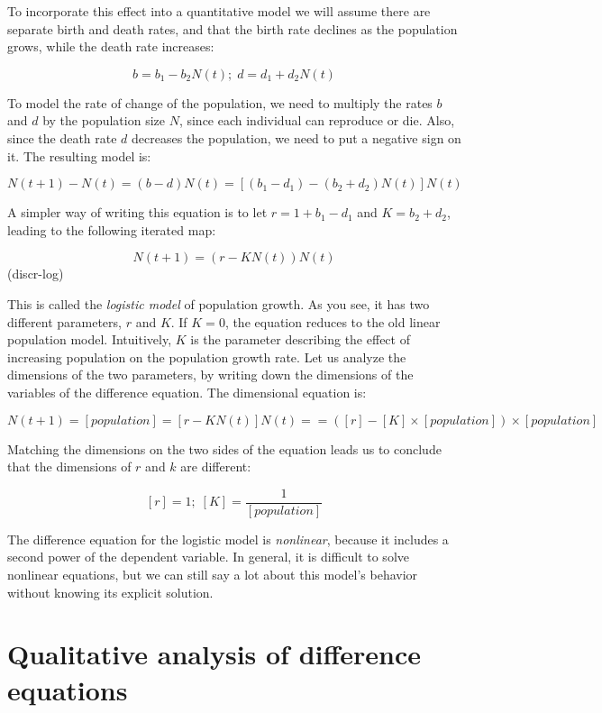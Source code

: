 \documentclass[
  letterpaper,
  DIV=11,
  numbers=noendperiod]{scrreprt}
\begin{document}
To incorporate this effect into a quantitative model we will assume
there are separate birth and death rates, and that the birth rate
declines as the population grows, while the death rate increases:

\[
b =  b_1 - b_2 N(t) ; \;   d = d_1 + d_2 N(t)
\]

To model the rate of change of the population, we need to multiply the
rates \(b\) and \(d\) by the population size \(N\), since each
individual can reproduce or die. Also, since the death rate \(d\)
decreases the population, we need to put a negative sign on it. The
resulting model is:

\[
N(t+1) - N(t) = (b -d)N(t) = [(b_1 - d_1) - (b_2 + d_2)N(t)] N(t)
\]

A simpler way of writing this equation is to let \(r = 1 + b_1 - d_1\)
and \(K = b_2 + d_2\), leading to the following iterated map:

\[
N(t+1) = (r - K N(t)) N(t)
\] (discr-log)

This is called the \emph{logistic model} of population growth. As you
see, it has two different parameters, \(r\) and \(K\). If \(K = 0\), the
equation reduces to the old linear population model. Intuitively, \(K\)
is the parameter describing the effect of increasing population on the
population growth rate. Let us analyze the dimensions of the two
parameters, by writing down the dimensions of the variables of the
difference equation. The dimensional equation is:

\[
N(t+1) = [population]= [r- K N(t)] N(t) =
= ([r]  - [K] \times [population]) \times [population]
\]

Matching the dimensions on the two sides of the equation leads us to
conclude that the dimensions of \(r\) and \(k\) are different:

\[
[r] = 1 ; \; [K] =  \frac{1}{[population]}
\]

The difference equation for the logistic model is \emph{nonlinear},
because it includes a second power of the dependent variable. In
general, it is difficult to solve nonlinear equations, but we can still
say a lot about this model's behavior without knowing its explicit
solution.

\hypertarget{qualitative-analysis-of-difference-equations}{%
\section{Qualitative analysis of difference
equations}\label{qualitative-analysis-of-difference-equations}}
\end{document}
